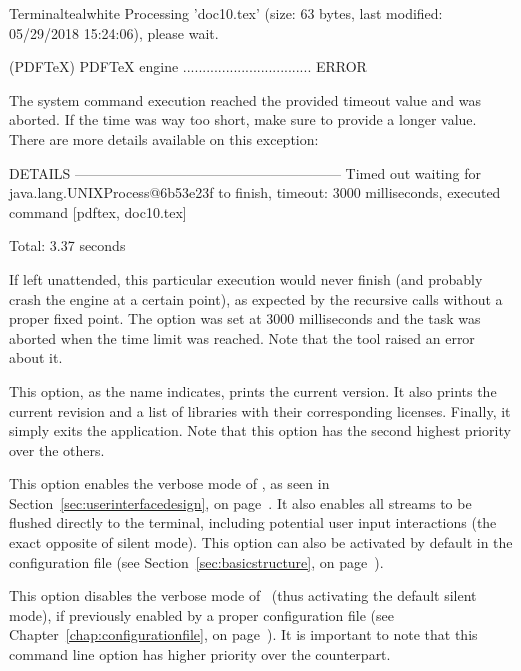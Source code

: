 \begin{description}
\begin{codebox}{Terminal}{teal}{\icnote}{white}
Processing 'doc10.tex' (size: 63 bytes, last modified: 05/29/2018
15:24:06), please wait.

(PDFTeX) PDFTeX engine .................................   ERROR

The system command execution reached the provided timeout value
and was aborted. If the time was way too short, make sure to
provide a longer value. There are more details available on this
exception:

DETAILS ---------------------------------------------------------
Timed out waiting for java.lang.UNIXProcess@6b53e23f to finish,
timeout: 3000 milliseconds, executed command [pdftex, doc10.tex]

Total: 3.37 seconds
\end{codebox}

If left unattended, this particular execution would never finish (and probably crash the engine at a certain point), as expected by the recursive calls without a proper fixed point. The  option was set at 3000 milliseconds and the task was aborted when the time limit was reached. Note that the tool raised an error about it.

\item[\describeop{V}{version}] This option, as the name indicates, prints the current version. It also prints the current revision and a list of libraries with their corresponding licenses. Finally, it simply exits the application. Note that this option has the second highest priority over the others.

\item[\describeop{v}{verbose}] This option enables the verbose mode of \arara, as seen in Section~\ref{sec:userinterfacedesign}, on page~\pageref{sec:userinterfacedesign}. It also enables all streams to be flushed directly to the terminal, including potential user input interactions (the exact opposite of silent mode). This option can also be activated by default in the configuration file (see Section~\ref{sec:basicstructure}, on page~\pageref{sec:basicstructure}).

\item[\describeop{s}{silent}] This option disables the verbose mode of \arara\ (thus activating the default silent mode), if previously enabled by a proper configuration file (see Chapter~\ref{chap:configurationfile}, on page~\pageref{chap:configurationfile}). It is important to note that this command line option has higher priority over the  counterpart.
\end{description}

